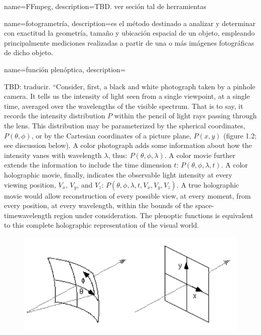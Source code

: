

{
    name={FFmpeg},
    description={TBD. ver seción tal de herramientas}
}

{
    name={fotogrametría},
    description={es el método destinado a analizar y determinar con exactitud la geometría, tamaño y ubicación espacial de un objeto, empleando principalmente mediciones realizadas a partir de una o más imágenes fotográficas de dicho objeto.}
}

{
    name={función plenóptica},
    description={TBD: traducir. ``Consider, first, a black and white photograph taken by a pinhole camera. It tells us the intensity of light seen from a single viewpoint, at a single time, averaged over the wavelengths of the visible spectrum. That is to say, it records the intensity distribution $P$ within the pencil of light rays passing through the lens. This distribution may be parameterized by the spherical coordinates, $P(\theta,\phi)$, or by the Cartesian coordinates of a picture plane, $P(x,y)$ (figure 1.2; see discussion below). A color photograph adds some information about how the intensity vanes with wavelength $\lambda$, thus: $P(\theta,\phi,\lambda)$. A color movie further extends the information to include the time dimension $t$: $P(\theta,\phi,\lambda,t)$. A color holographic movie, finally, indicates the observable light intensity at every viewing position, $V_x$, $V_y$, and $V_z$: $P(\theta,\phi,\lambda,t,V_x,V_y,V_z)$. A true holographic movie would allow reconstruction of every possible view, at every moment, from every position, at every wavelength, within the bounds of the space-timewavelength region under consideration. The plenoptic functions is equivalent to this complete holographic representation of the visual world.
    \begin{figure}[H]
        \centering
        \includegraphics[scale=0.5]{imagenes/funcion-plenoptica/funcion-plenoptica.png}

\end{figure}}}
